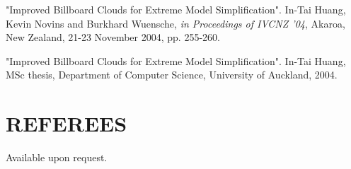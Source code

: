 \begin{resume}
"Improved Billboard Clouds for Extreme Model Simplification". In-Tai Huang, Kevin Novins and Burkhard Wuensche, \textit{in Proceedings of IVCNZ '04}, Akaroa, New Zealand, 21-23 November 2004, pp. 255-260. 

"Improved Billboard Clouds for Extreme Model Simplification". In-Tai Huang, MSc thesis, Department of Computer Science, University of Auckland, 2004.

\section{REFEREES} 
\vspace{0.1in}

Available upon request.
 
\end{resume}































